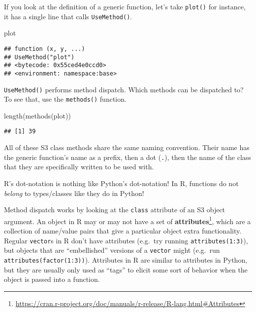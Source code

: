 \documentclass[
  12pt,
  krantz2]{krantz}
\makeatletter
\newenvironment{Shaded}{\begin{snugshade}}{\end{snugshade}}
\newcommand{\FunctionTok}[1]{\textcolor[rgb]{0,0,0}{#1}}
\newcommand{\NormalTok}[1]{#1}
\renewcommand{\href}[2]{#2\footnote{\url{#1}}}
\newenvironment{kframe}{%
\medskip{}
\setlength{\fboxsep}{.8em}
 \def\at@end@of@kframe{}%
 \ifinner\ifhmode%
  \def\at@end@of@kframe{\end{minipage}}%
  \begin{minipage}{\columnwidth}%
 \fi\fi%
 \def\FrameCommand##1{\hskip\@totalleftmargin \hskip-\fboxsep
 \colorbox{shadecolor}{##1}\hskip-\fboxsep
     \hskip-\linewidth \hskip-\@totalleftmargin \hskip\columnwidth}%
 \MakeFramed {\advance\hsize-\width
   \@totalleftmargin\z@ \linewidth\hsize
   \@setminipage}}%
 {\par\unskip\endMakeFramed%
 \at@end@of@kframe}
\renewenvironment{Shaded}{\begin{kframe}}{\end{kframe}}
\makeatother
\begin{document}
If you look at the definition of a generic function, let's take \texttt{plot()} for instance, it has a single line that calls \texttt{UseMethod()}.

\begin{Shaded}
\begin{Highlighting}[]
\NormalTok{plot}
\end{Highlighting}
\end{Shaded}

\begin{verbatim}
## function (x, y, ...) 
## UseMethod("plot")
## <bytecode: 0x55ced4e0ccd0>
## <environment: namespace:base>
\end{verbatim}

\texttt{UseMethod()} performs method dispatch. Which methods can be dispatched to? To see that, use the \texttt{methods()} function.

\begin{Shaded}
\begin{Highlighting}[]
\FunctionTok{length}\NormalTok{(}\FunctionTok{methods}\NormalTok{(plot))}
\end{Highlighting}
\end{Shaded}

\begin{verbatim}
## [1] 39
\end{verbatim}

All of these S3 class methods share the same naming convention. Their name has the generic function's name as a prefix, then a dot (\texttt{.}), then the name of the class that they are specifically written to be used with.

\begin{rmd-caution}
R's dot-notation is nothing like Python's dot-notation! In R, functions do not \emph{belong} to types/classes like they do in Python!

\end{rmd-caution}

Method dispatch works by looking at the \texttt{class} attribute of an S3 object argument. An object in R may or may not have a set of \href{https://cran.r-project.org/doc/manuals/r-release/R-lang.html\#Attributes}{\textbf{attributes}}, which are a collection of name/value pairs that give a particular object extra functionality. Regular \texttt{vector}s in R don't have attributes (e.g.~try running \texttt{attributes(1:3)}), but objects that are ``embellished'' versions of a \texttt{vector} might (e.g.~run \texttt{attributes(factor(1:3))}). Attributes in R are similar to attributes in Python, but they are usually only used as ``tags'' to elicit some sort of behavior when the object is passed into a function.
\end{document}
